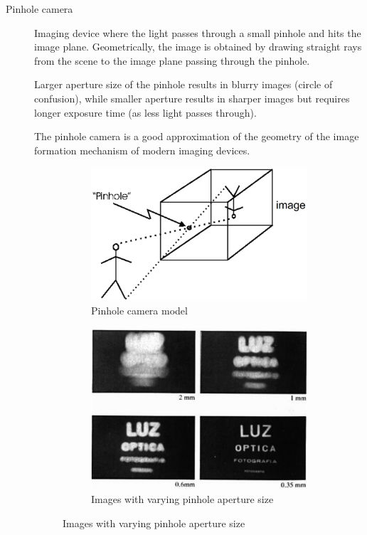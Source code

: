 \begin{description}
    \item[Pinhole camera] 
        Imaging device where the light passes through a small pinhole and hits the image plane.
        Geometrically, the image is obtained by drawing straight rays from the scene to the image plane passing through the pinhole.

        \begin{remark}
            Larger aperture size of the pinhole results in blurry images (circle of confusion), 
            while smaller aperture results in sharper images but requires longer exposure time (as less light passes through).
        \end{remark}

        \begin{remark}
            The pinhole camera is a good approximation of the geometry of the image formation mechanism of modern imaging devices.
        \end{remark}

        \begin{figure}[h]
            \begin{subfigure}{.4\textwidth}
                \centering
                \includegraphics[width=0.8\linewidth]{./img/pinhole.png}
                \caption{Pinhole camera model}
            \end{subfigure}
            \begin{subfigure}{.45\textwidth}
                \centering
                \includegraphics[width=0.7\linewidth]{./img/pinhole_hole_size.png}
                \caption{Images with varying pinhole aperture size}
            \end{subfigure}
        \end{figure}
\end{description}



